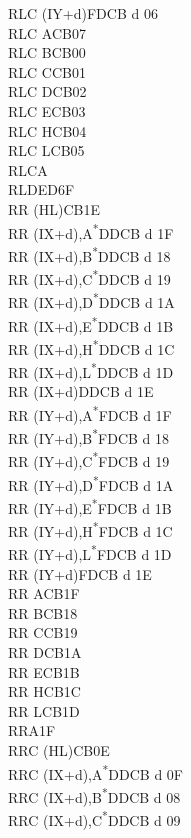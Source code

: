\documentclass[oneside,a4paper]{book}
\begin{document}
\begin{multicols}{3}
{\begin{tabbing}
RLC (IY+d)\>FDCB d 06\\
RLC A\>CB07\\
RLC B\>CB00\\
RLC C\>CB01\\
RLC D\>CB02\\
RLC E\>CB03\\
RLC H\>CB04\\
RLC L\>CB05\\
RLCA\\
RLD\>ED6F\\
RR (HL)\>CB1E\\
RR (IX+d),A\textsuperscript{*}\>DDCB d 1F\\
RR (IX+d),B\textsuperscript{*}\>DDCB d 18\\
RR (IX+d),C\textsuperscript{*}\>DDCB d 19\\
RR (IX+d),D\textsuperscript{*}\>DDCB d 1A\\
RR (IX+d),E\textsuperscript{*}\>DDCB d 1B\\
RR (IX+d),H\textsuperscript{*}\>DDCB d 1C\\
RR (IX+d),L\textsuperscript{*}\>DDCB d 1D\\
RR (IX+d)\>DDCB d 1E\\
RR (IY+d),A\textsuperscript{*}\>FDCB d 1F\\
RR (IY+d),B\textsuperscript{*}\>FDCB d 18\\
RR (IY+d),C\textsuperscript{*}\>FDCB d 19\\
RR (IY+d),D\textsuperscript{*}\>FDCB d 1A\\
RR (IY+d),E\textsuperscript{*}\>FDCB d 1B\\
RR (IY+d),H\textsuperscript{*}\>FDCB d 1C\\
RR (IY+d),L\textsuperscript{*}\>FDCB d 1D\\
RR (IY+d)\>FDCB d 1E\\
RR A\>CB1F\\
RR B\>CB18\\
RR C\>CB19\\
RR D\>CB1A\\
RR E\>CB1B\\
RR H\>CB1C\\
RR L\>CB1D\\
RRA\>1F\\
RRC (HL)\>CB0E\\
RRC (IX+d),A\textsuperscript{*}\>DDCB d 0F\\
RRC (IX+d),B\textsuperscript{*}\>DDCB d 08\\
RRC (IX+d),C\textsuperscript{*}\>DDCB d 09\\

\end{tabbing}}
\end{multicols}
\end{document}

